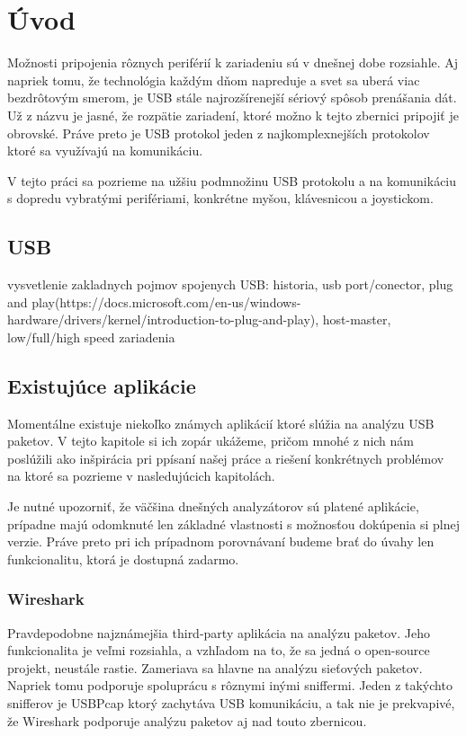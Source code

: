 \chapter{Úvod}

Možnosti pripojenia rôznych periférií k zariadeniu sú v dnešnej dobe rozsiahle. Aj napriek tomu, že technológia každým dňom napreduje a svet sa uberá viac bezdrôtovým smerom, je USB stále najrozšírenejší sériový spôsob prenášania dát. Už z názvu  je jasné, že rozpätie zariadení, ktoré možno k tejto zbernici pripojiť je obrovské. Práve preto je USB protokol jeden z najkomplexnejších protokolov ktoré sa využívajú na komunikáciu.

V tejto práci sa pozrieme na užšiu podmnožinu USB protokolu a na komunikáciu s dopredu vybratými perifériami, konkrétne myšou, klávesnicou a joystickom.

\section{USB}
vysvetlenie zakladnych pojmov spojenych USB: historia, usb port/conector, plug and play(https://docs.microsoft.com/en-us/windows-hardware/drivers/kernel/introduction-to-plug-and-play), host-master, low/full/high speed zariadenia

\section{Existujúce aplikácie}

Momentálne existuje niekoľko známych aplikácií ktoré slúžia na analýzu USB paketov. V tejto kapitole si ich zopár ukážeme, pričom mnohé z nich nám poslúžili ako inšpirácia pri ppísaní našej práce a riešení konkrétnych problémov na ktoré sa pozrieme v nasledujúcich kapitolách. 

Je nutné upozorniť, že väčšina dnešných analyzátorov sú platené aplikácie, prípadne majú odomknuté len základné vlastnosti s možnosťou dokúpenia si plnej verzie. Práve preto pri ich prípadnom porovnávaní budeme brať do úvahy len funkcionalitu, ktorá je dostupná zadarmo.

\subsection*{Wireshark}

Pravdepodobne najznámejšia third-party aplikácia na analýzu paketov. Jeho funkcionalita je veľmi rozsiahla, a vzhľadom na to, že sa jedná o open-source projekt, neustále rastie. Zameriava sa hlavne na analýzu sieťových paketov. Napriek tomu podporuje spoluprácu s rôznymi inými sniffermi. Jeden z takýchto snifferov je USBPcap ktorý zachytáva USB komunikáciu, a tak nie je prekvapivé, že Wireshark podporuje analýzu paketov aj nad touto zbernicou. 

